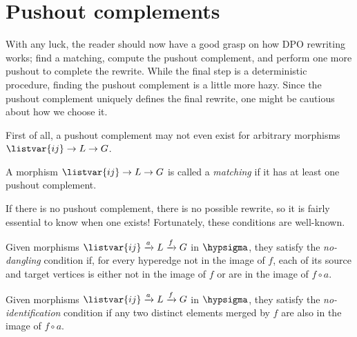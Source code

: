 \section{Pushout complements}

With any luck, the reader should now have a good grasp on how DPO rewriting
works; find a matching, compute the pushout complement, and perform one more
pushout to complete the rewrite.
While the final step is a deterministic procedure, finding the pushout
complement is a little more hazy.
Since the pushout complement uniquely defines the final rewrite, one might be
cautious about how we choose it.

First of all, a pushout complement may not even exist for arbitrary morphisms
\(\listvar{ij} \to L \to G\).

\begin{definition}
    A morphism \(\listvar{ij} \to L \to G\) is called a \emph{matching} if it
    has at least one pushout complement.
\end{definition}

If there is no pushout complement, there is no possible rewrite, so it is fairly
essential to know when one exists!
Fortunately, these conditions are well-known.

\begin{definition}
    Given morphisms \(\listvar{ij} \xrightarrow{a} L \xrightarrow{f} G\) in
    \(\hypsigma\), they satisfy the \emph{no-dangling} condition if, for every
    hyperedge not in
    the image of \(f\), each of its source and target vertices is either not in
    the image of \(f\) or are in the image of \(f \circ a\).
\end{definition}

\begin{example}
\end{example}

\begin{definition}
    Given morphisms \(\listvar{ij} \xrightarrow{a} L \xrightarrow{f} G\) in
    \(\hypsigma\), they satisfy the \emph{no-identification} condition if any
    two distinct elements merged by \(f\) are also in the image of \(f \circ a\).
\end{definition}

\begin{example}
\end{example}

